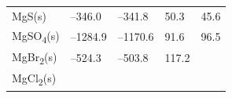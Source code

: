 \documentclass[
  9pt,
]{extbook}
\theoremstyle{definition}
\theoremstyle{definition}
\theoremstyle{definition}
\theoremstyle{remark}
\begin{document}
\begin{longtable}[]{@{}lllll@{}}
\begin{minipage}[t]{0.10\columnwidth}
MgS(s)\strut
\end{minipage} & \begin{minipage}[t]{0.19\columnwidth}\raggedright
--346.0\strut
\end{minipage} & \begin{minipage}[t]{0.20\columnwidth}\raggedright
--341.8\strut
\end{minipage} & \begin{minipage}[t]{0.18\columnwidth}\raggedright
50.3\strut
\end{minipage} & \begin{minipage}[t]{0.18\columnwidth}\raggedright
45.6\strut
\end{minipage}\tabularnewline
\begin{minipage}[t]{0.10\columnwidth}\raggedright
MgSO\textsubscript{4}(s)\strut
\end{minipage} & \begin{minipage}[t]{0.19\columnwidth}\raggedright
--1284.9\strut
\end{minipage} & \begin{minipage}[t]{0.20\columnwidth}\raggedright
--1170.6\strut
\end{minipage} & \begin{minipage}[t]{0.18\columnwidth}\raggedright
91.6\strut
\end{minipage} & \begin{minipage}[t]{0.18\columnwidth}\raggedright
96.5\strut
\end{minipage}\tabularnewline
\begin{minipage}[t]{0.10\columnwidth}\raggedright
MgBr\textsubscript{2}(s)\strut
\end{minipage} & \begin{minipage}[t]{0.19\columnwidth}\raggedright
--524.3\strut
\end{minipage} & \begin{minipage}[t]{0.20\columnwidth}\raggedright
--503.8\strut
\end{minipage} & \begin{minipage}[t]{0.18\columnwidth}\raggedright
117.2\strut
\end{minipage} & \begin{minipage}[t]{0.18\columnwidth}\raggedright
\strut
\end{minipage}\tabularnewline
\begin{minipage}[t]{0.10\columnwidth}\raggedright
MgCl\textsubscript{2}(s)\strut
\end{minipage} & \begin{minipage}[t]{0.19\columnwidth}\raggedright

\end{minipage}
\end{longtable}
\end{document}
